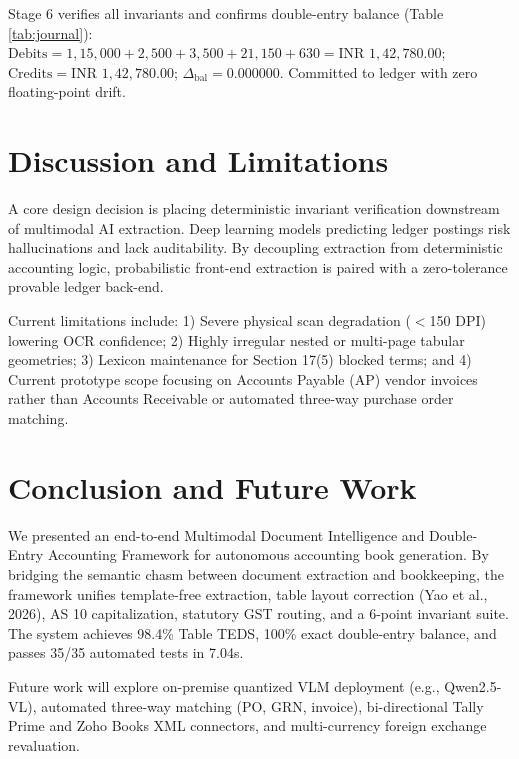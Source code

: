 \documentclass[conference]{IEEEtran}
\begin{document}
Stage 6 verifies all invariants and confirms double-entry balance (Table \ref{tab:journal}):
$\text{Debits} = 1,15,000 + 2,500 + 3,500 + 21,150 + 630 = \text{INR } 1,42,780.00$;
$\text{Credits} = \text{INR } 1,42,780.00$;
$\Delta_{\text{bal}} = 0.000000$. Committed to ledger with zero floating-point drift.

\section{Discussion and Limitations}
A core design decision is placing deterministic invariant verification downstream of multimodal AI extraction. Deep learning models predicting ledger postings risk hallucinations and lack auditability. By decoupling extraction from deterministic accounting logic, probabilistic front-end extraction is paired with a zero-tolerance provable ledger back-end.

Current limitations include: 1) Severe physical scan degradation ($<$150 DPI) lowering OCR confidence; 2) Highly irregular nested or multi-page tabular geometries; 3) Lexicon maintenance for Section 17(5) blocked terms; and 4) Current prototype scope focusing on Accounts Payable (AP) vendor invoices rather than Accounts Receivable or automated three-way purchase order matching.

\section{Conclusion and Future Work}
We presented an end-to-end Multimodal Document Intelligence and Double-Entry Accounting Framework for autonomous accounting book generation. By bridging the semantic chasm between document extraction and bookkeeping, the framework unifies template-free extraction, table layout correction (Yao et al., 2026), AS 10 capitalization, statutory GST routing, and a 6-point invariant suite. The system achieves 98.4\% Table TEDS, 100\% exact double-entry balance, and passes 35/35 automated tests in 7.04s.

Future work will explore on-premise quantized VLM deployment (e.g., Qwen2.5-VL), automated three-way matching (PO, GRN, invoice), bi-directional Tally Prime and Zoho Books XML connectors, and multi-currency foreign exchange revaluation.



\end{document}
